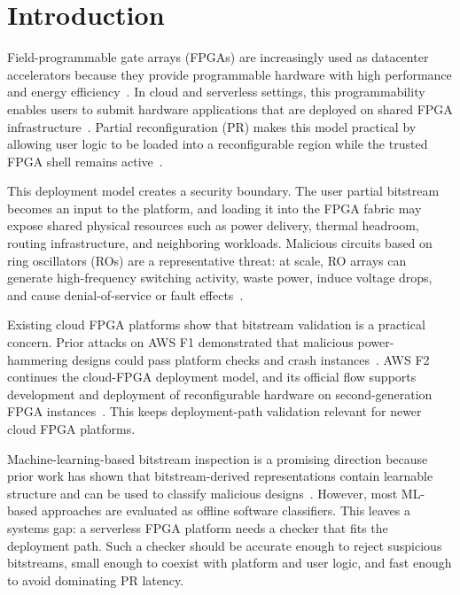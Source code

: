 \chapter{Introduction}
\label{sec:introduction}

Field-programmable gate arrays (FPGAs) are increasingly used as datacenter accelerators because they provide programmable hardware with high performance and energy efficiency~\cite{caulfield2016cloud,chung2018brainwave,bobda2022future,wang2022fpga}. In cloud and serverless settings, this programmability enables users to submit hardware applications that are deployed on shared FPGA infrastructure~\cite{mainas2025f3}. Partial reconfiguration (PR) makes this model practical by allowing user logic to be loaded into a reconfigurable region while the trusted FPGA shell remains active~\cite{korolija2020os,ramhorst2025coyote}.

This deployment model creates a security boundary. The user partial bitstream becomes an input to the platform, and loading it into the FPGA fabric may expose shared physical resources such as power delivery, thermal headroom, routing infrastructure, and neighboring workloads. Malicious circuits based on ring oscillators (ROs) are a representative threat: at scale, RO arrays can generate high-frequency switching activity, waste power, induce voltage drops, and cause denial-of-service or fault effects~\cite{gnad2017voltage,la2020fpgadefender,la2021denial,provelengios2020power,boutros2020neighbors, mahmoud2023practical}.

Existing cloud FPGA platforms show that bitstream validation is a practical concern. Prior attacks on AWS F1 demonstrated that malicious power-hammering designs could pass platform checks and crash instances~\cite{la2021denial}. AWS F2 continues the cloud-FPGA deployment model, and its official flow supports development and deployment of reconfigurable hardware on second-generation FPGA instances~\cite{awsF2Docs}. This keeps deployment-path validation relevant for newer cloud FPGA platforms.

Machine-learning-based bitstream inspection is a promising direction because prior work has shown that bitstream-derived representations contain learnable structure and can be used to classify malicious designs~\cite{rettkowski2019inspection,chaudhuri2022detection,chaudhuri2023criticality,elnaggar2023learning,palumbo2022trojan}. However, most ML-based approaches are evaluated as offline software classifiers. This leaves a systems gap: a serverless FPGA platform needs a checker that fits the deployment path. Such a checker should be accurate enough to reject suspicious bitstreams, small enough to coexist with platform and user logic, and fast enough to avoid dominating PR latency.

